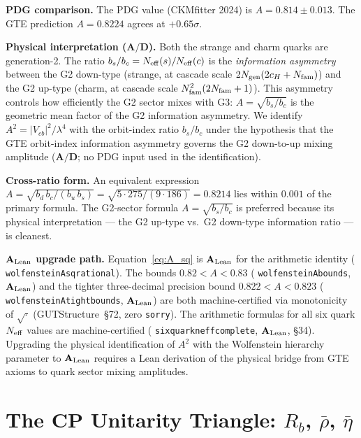 \documentclass[11pt]{article}
\theoremstyle{remark}
\newcommand{\Ngen}{N_{\rm gen}}
\newcommand{\Nfam}{N_{\rm fam}}
\newcommand{\cH}{c_H}
\newcommand{\lean}[1]{%
  \penalty-100
  \begingroup\def\_{\textunderscore\allowbreak}\texttt{#1}\endgroup}
\newcommand{\lam}{\lambda}
\newcommand{\Rbar}{\bar{\rho}}
\newcommand{\Ebar}{\bar{\eta}}
\newcommand{\bu}{b_u}
\newcommand{\bd}{b_d}
\newcommand{\bc}{b_c}
\newcommand{\bs}{b_s}
\newcommand{\Rb}{R_b}
\newcommand{\CatAL}{\ensuremath{\textbf{A}_{\rm Lean}}}
\newcommand{\CatAD}{\textbf{A/D}}
\begin{document}
\medskip

\textbf{PDG comparison.}
The PDG value (CKMfitter 2024) is $A = 0.814 \pm 0.013$.
The GTE prediction $A = 0.8224$ agrees at $+0.65\sigma$.

\medskip

\textbf{Physical interpretation ($\CatAD$).}
Both the strange and charm quarks are generation-2.
The ratio $\bs/\bc = N_{\rm eff}(s)/N_{\rm eff}(c)$ is the \emph{information asymmetry}
between the G2 down-type (strange, at cascade scale $2\Ngen(2\cH+\Nfam)$) and the G2
up-type (charm, at cascade scale $\Nfam^2(2\Nfam+1)$).
This asymmetry controls how efficiently the G2 sector mixes with G3: $A = \sqrt{\bs/\bc}$
is the geometric mean factor of the G2 information asymmetry.
We identify $A^2 = |V_{cb}|^2/\lam^4$ with the orbit-index ratio $\bs/\bc$
under the hypothesis that the GTE orbit-index information asymmetry governs the
G2 down-to-up mixing amplitude ($\CatAD$; no PDG input used in the identification).

\medskip

\textbf{Cross-ratio form.}
An equivalent expression $A = \sqrt{\bd\,\bc/(\bu\,\bs)} = \sqrt{5\cdot 275/(9\cdot 186)}
= 0.8214$ lies within $0.001$ of the primary formula.
The G2-sector formula $A = \sqrt{\bs/\bc}$ is preferred because its physical
interpretation --- the G2 up-type vs.~G2 down-type information ratio --- is cleanest.

\medskip

\textbf{$\CatAL$ upgrade path.}
Equation~\eqref{eq:A_sq} is $\CatAL$ for the arithmetic identity
(\lean{wolfenstein\_A\_sq\_rational}).
The bounds $0.82 < A < 0.83$ (\lean{wolfenstein\_A\_bounds}, $\CatAL$) and the
tighter three-decimal precision bound $0.822 < A < 0.823$
(\lean{wolfenstein\_A\_tight\_bounds}, $\CatAL$) are both machine-certified
via monotonicity of $\sqrt{\cdot}$ (GUTStructure~\S72, zero \texttt{sorry}).
The arithmetic formulas for all six quark $N_{\rm eff}$ values are
machine-certified (\lean{six\_quark\_neff\_complete}, $\CatAL$, \S34).
Upgrading the physical identification of $A^2$ with the Wolfenstein hierarchy parameter
to $\CatAL$ requires a Lean derivation of the physical bridge from GTE axioms to quark
sector mixing amplitudes.

\section{The CP Unitarity Triangle: \boldmath$\Rb$, $\Rbar$, $\Ebar$}
\label{sec:rho_eta}
\end{document}
